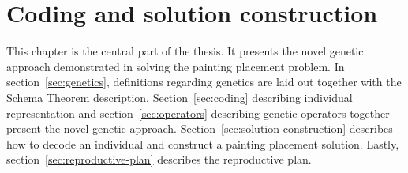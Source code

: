 \chapter{Coding and solution construction}\label{ch:coding-and-solution-construction}

This chapter is the central part of the thesis.
It presents the novel genetic approach demonstrated in solving the painting placement problem.
In section~\ref{sec:genetics}, definitions regarding genetics are laid out together with the Schema Theorem description.
Section~\ref{sec:coding} describing individual representation and section~\ref{sec:operators}
describing genetic operators together present the novel genetic approach.
Section~\ref{sec:solution-construction} describes how to decode an individual and construct a painting placement solution.
Lastly, section~\ref{sec:reproductive-plan} describes the reproductive plan.







